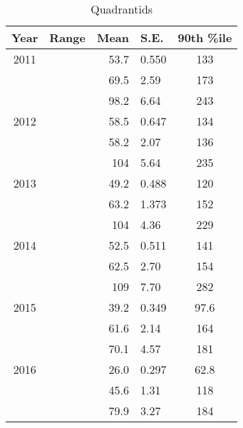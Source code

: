 \begin{table}
	\centering
	\begin{tabular}{|c|c|r@{ \,$\pm$\, }l|c|}
		\hline 
		Year & Range & Mean & S.E. & 90th \%ile\\ 
		\hline 
		2011 & & 53.7 & 0.550 & 133   \\ 
		\hline 
		& & 69.5 & 2.59 & 173   \\ 
		\hline 
		& & 98.2 & 6.64 & 243   \\ 
		\hline 
		2012 & & 58.5 & 0.647 & 134   \\ 
		\hline 
		& & 58.2 & 2.07 & 136   \\ 
		\hline 
		& & 104 & 5.64 & 235   \\ 
		\hline 
		2013 & & 49.2 & 0.488 & 120   \\ 
		\hline 
		& & 63.2 & 1.373 & 152   \\ 
		\hline 
		& & 104 & 4.36 & 229   \\ 
		\hline 
		2014 & & 52.5 & 0.511 & 141   \\ 
		\hline 
		& & 62.5 & 2.70 & 154   \\ 
		\hline 
		& & 109 & 7.70 & 282  \\ 
		\hline 
		2015 & & 39.2 & 0.349 & 97.6   \\ 
		\hline 
		& & 61.6 & 2.14 & 164   \\ 
		\hline 
		& & 70.1 & 4.57 & 181   \\ 
		\hline
		2016 & & 26.0 & 0.297 & 62.8	\\
		\hline 
		& & 45.6 & 1.31 & 118   \\ 
		\hline 
		& & 79.9 & 3.27 & 184   \\ 
		\hline 
	\end{tabular}
	\caption{Quadrantids} 
\end{table}

